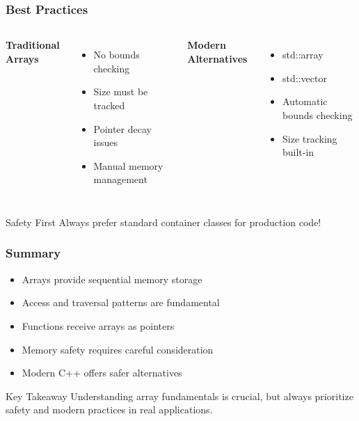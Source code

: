 \documentclass[aspectratio=169]{beamer}
\begin{document}
\begin{frame}
    \frametitle{Best Practices}
    \begin{columns}
        \textbf{Traditional Arrays}
        \begin{itemize}
            \item No bounds checking
            \item Size must be tracked
            \item Pointer decay issues
            \item Manual memory management
        \end{itemize}
        
        \textbf{Modern Alternatives}
        \begin{itemize}
            \item std::array
            \item std::vector
            \item Automatic bounds checking
            \item Size tracking built-in
        \end{itemize}
    \end{columns}
    \pause
    \begin{alertblock}{Safety First}
        Always prefer standard container classes for production code!
    \end{alertblock}
\end{frame}

\begin{frame}
    \frametitle{Summary}
    \begin{itemize}[<+->]
        \item Arrays provide sequential memory storage
        \item Access and traversal patterns are fundamental
        \item Functions receive arrays as pointers
        \item Memory safety requires careful consideration
        \item Modern C++ offers safer alternatives
    \end{itemize}
    \pause
    \begin{exampleblock}{Key Takeaway}
        Understanding array fundamentals is crucial, but always prioritize safety and modern practices in real applications.
    \end{exampleblock}
\end{frame}
\end{document}
